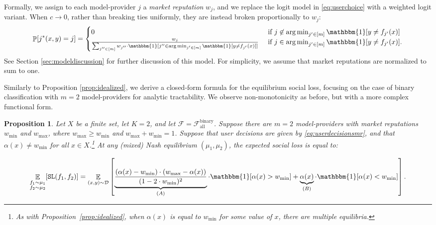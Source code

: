 \documentclass[letterpaper,11pt]{article}
\newtheorem{proposition}{Proposition}
\theoremstyle{plain}
\DeclareMathOperator*{\argmin}{arg\,min}
\DeclareMathOperator*{\E}{\mathbb{E}}
\DeclareMathOperator*{\Prob}{\mathbb{P}}
\begin{document}
Formally, we assign to each model-provider $j$ a \textit{market reputation} $w_j$, and we replace the logit model in \eqref{eq:userchoice} with a {weighted} logit variant. 
When $c\to 0$, rather than breaking ties uniformly, they are instead broken proportionally to $w_j$: 
\begin{equation}
    \label{eq:userdecisionsmr}
    \Prob[j^*(x,y) = j] = 
\begin{cases}
0 & \text{ if } j \not\in \argmin_{j' \in [m]} \mathbbm{1}[y \neq f_{j'}(x)] \\
\frac{w_j}{\sum_{j'' \in [m]} w_{j''} \cdot \mathbbm{1}[j'' \in \argmin_{j' \in [m]} \mathbbm{1}[y \neq f_{j'}(x)]]}
& \text{ if } j \in \argmin_{j' \in [m]} \mathbbm{1}[y \neq f_{j'}(x)].
\end{cases}
\end{equation} 
See Section \ref{sec:modeldiscussion} for further discussion of this model. For simplicity, we assume that market reputations are normalized to sum to one. 

Similarly to Proposition \ref{prop:idealized}, we derive a closed-form formula for the equilibrium social loss, focusing on the case of binary classification with $m = 2$ model-providers for analytic tractability. We observe non-monotonicity as before, but with a more complex functional form. 
\begin{proposition}
\label{prop:2model-providers}
Let $X$ be a finite set, let $K = 2$, and let $\mathcal{F} = \mathcal{F}^{\text{binary}}_{\text{all}}$. Suppose there are $m=2$ model-providers with market reputations $w_{\text{min}}$ and $w_{\text{max}}$, where $w_{\text{max}} \ge w_{\text{min}}$ and $w_{\text{max}} +  w_{\text{min}} = 1$. Suppose that user decisions are given by \eqref{eq:userdecisionsmr}, and that $\alpha(x) \neq w_{\text{min}}$ for all $x \in X$.\footnote{As with Proposition~\ref{prop:idealized}, when $\alpha(x)$ is equal to $w_{\text{min}}$ for some value of $x$, there are multiple equilibria.} At any (mixed) Nash equilibrium $(\mu_1, \mu_2)$, the expected social loss  is equal to: 

\begin{equation}
\label{eq:2model-providerssocialloss} 
\E_{\substack{f_1 \sim \mu_1 \\ f_2 \sim \mu_2}}[\texttt{SL}(f_1, f_2)] = \E_{(x, y) \sim \mathcal{D}} \left[\underbrace{\frac{(\alpha(x) - w_{\text{min}}) \cdot (w_{\text{max}}  - \alpha(x))}{(1 - 2 \cdot w_{\text{min}})^2}}_{(A)} \cdot \mathbbm{1}[\alpha(x) > w_{\text{min}} ]  + \underbrace{\alpha(x)}_{(B)} \cdot \mathbbm{1}[\alpha(x) < w_{\text{min}} ]  \right]. 
\end{equation}
\end{proposition}
\end{document}
